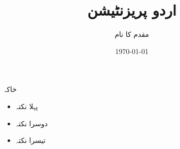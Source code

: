 \documentclass{beamer}
\title{اردو پریزنٹیشن}
\author{مقدم کا نام}
\date{\today}
\begin{document}
\begin{frame}
  \titlepage
\end{frame}

\begin{frame}{خاکہ}
  \begin{itemize}
    \item پہلا نکتہ
    \item دوسرا نکتہ
    \item تیسرا نکتہ
  \end{itemize}
\end{frame}
\end{document}

